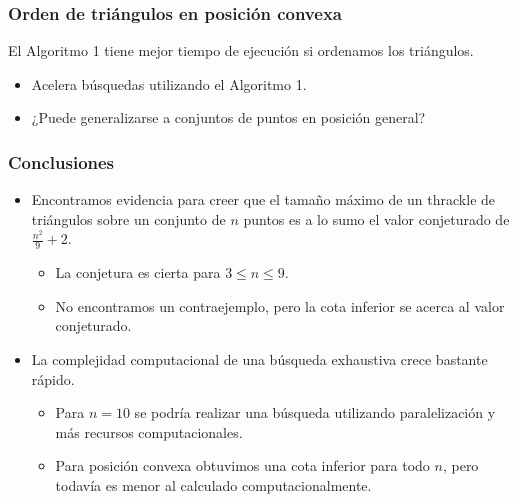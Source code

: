 \documentclass{beamer}
\begin{document}
\begin{frame}
  \frametitle{Orden de triángulos en posición convexa}
  El Algoritmo 1 tiene mejor tiempo de ejecución si ordenamos los triángulos.
  \begin{overprint}
    \begin{figure}[htb]
      \centering
      
    \end{figure}
    \begin{figure}[htb]
      \centering
      
    \end{figure}
    \begin{figure}[htb]
      \centering
      
    \end{figure}
    \begin{itemize}
      \item Acelera búsquedas utilizando el Algoritmo 1.
      \item ¿Puede generalizarse a conjuntos de puntos en posición general?
    \end{itemize}
  \end{overprint}
\end{frame}

\begin{frame}
  \frametitle{Conclusiones}
  \begin{itemize}
    \item Encontramos evidencia para creer que el tamaño máximo de un thrackle
      de triángulos sobre un conjunto de $n$ puntos es a lo sumo el valor
      conjeturado de $\frac{n^2}{9}+2$.
      \begin{itemize}
          \item La conjetura es cierta para $3\le n\le 9$.
          \item No encontramos un contraejemplo, pero la cota inferior se acerca
            al valor conjeturado.
      \end{itemize}
    \item La complejidad computacional de una búsqueda exhaustiva crece bastante
      rápido.
      \begin{itemize}
          \item Para $n=10$ se podría realizar una búsqueda utilizando
            paralelización y más recursos computacionales.
          \item Para posición convexa obtuvimos una cota inferior para todo
            $n$, pero todavía es menor al calculado computacionalmente.
      \end{itemize}
  \end{itemize}
\end{frame}
\end{document}
